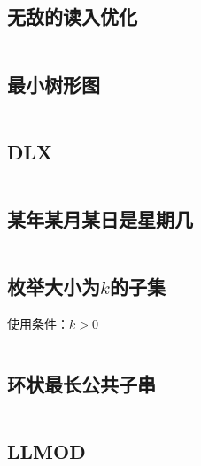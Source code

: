 \documentclass[landscape, twoside, a4paper]{article}
\newcommand{\cppcode}[1]{
	\inputminted[mathescape,
	frame=lines,linenos]{cpp}{source/#1}
}
\begin{document}
\begin{multicols}{2}
\begin{spacing}{0.8}
\cppcode{miscellany/Steiner-Tree.cpp}


\subsection{无敌的读入优化}

\cppcode{miscellany/Reader.cpp}


\subsection{最小树形图}

\cppcode{miscellany/mintreegraph.cpp}


\subsection{DLX}

\cppcode{miscellany/DLX.cpp}






\subsection{某年某月某日是星期几}


\cppcode{miscellany/what-day-is-today.cpp}


\subsection{枚举大小为$k$的子集}


使用条件：$k > 0$


\cppcode{miscellany/subset-of-size-k.cpp}


\subsection{环状最长公共子串}


\cppcode{miscellany/cyclic-longest-common-string.cpp}


\subsection{LLMOD}


\cppcode{miscellany/LLMOD.cpp}



\end{spacing}
\end{multicols}
\end{document}
